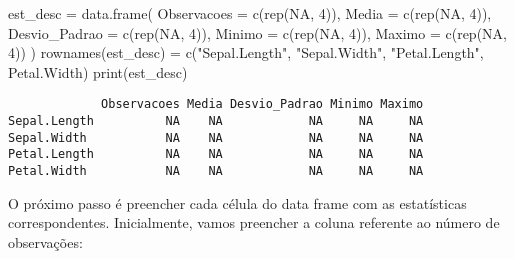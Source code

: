 \documentclass[
  letterpaper,
  DIV=11,
  numbers=noendperiod]{scrreprt}
\newenvironment{Shaded}{\begin{snugshade}}{\end{snugshade}}
\newcommand{\AttributeTok}[1]{\textcolor[rgb]{0.40,0.45,0.13}{#1}}
\newcommand{\ConstantTok}[1]{\textcolor[rgb]{0.56,0.35,0.01}{#1}}
\newcommand{\DecValTok}[1]{\textcolor[rgb]{0.68,0.00,0.00}{#1}}
\newcommand{\FunctionTok}[1]{\textcolor[rgb]{0.28,0.35,0.67}{#1}}
\newcommand{\NormalTok}[1]{\textcolor[rgb]{0.00,0.23,0.31}{#1}}
\newcommand{\OtherTok}[1]{\textcolor[rgb]{0.00,0.23,0.31}{#1}}
\newcommand{\SpecialCharTok}[1]{\textcolor[rgb]{0.37,0.37,0.37}{#1}}
\newcommand{\StringTok}[1]{\textcolor[rgb]{0.13,0.47,0.30}{#1}}
\begin{document}
\begin{Shaded}
\begin{Highlighting}[]
\NormalTok{est\_desc }\OtherTok{=} \FunctionTok{data.frame}\NormalTok{(}
  \AttributeTok{Observacoes =} \FunctionTok{c}\NormalTok{(}\FunctionTok{rep}\NormalTok{(}\ConstantTok{NA}\NormalTok{, }\DecValTok{4}\NormalTok{)),}
  \AttributeTok{Media =} \FunctionTok{c}\NormalTok{(}\FunctionTok{rep}\NormalTok{(}\ConstantTok{NA}\NormalTok{, }\DecValTok{4}\NormalTok{)),}
  \AttributeTok{Desvio\_Padrao =} \FunctionTok{c}\NormalTok{(}\FunctionTok{rep}\NormalTok{(}\ConstantTok{NA}\NormalTok{, }\DecValTok{4}\NormalTok{)),}
  \AttributeTok{Minimo =} \FunctionTok{c}\NormalTok{(}\FunctionTok{rep}\NormalTok{(}\ConstantTok{NA}\NormalTok{, }\DecValTok{4}\NormalTok{)),}
  \AttributeTok{Maximo  =} \FunctionTok{c}\NormalTok{(}\FunctionTok{rep}\NormalTok{(}\ConstantTok{NA}\NormalTok{, }\DecValTok{4}\NormalTok{))}
\NormalTok{)}
\FunctionTok{rownames}\NormalTok{(est\_desc) }\OtherTok{=} \FunctionTok{c}\NormalTok{(}\StringTok{"Sepal.Length"}\NormalTok{, }\StringTok{"Sepal.Width"}\NormalTok{, }\StringTok{"Petal.Length"}\NormalTok{, }\StringTok{\textquotesingle{}Petal.Width\textquotesingle{}}\NormalTok{)}
\FunctionTok{print}\NormalTok{(est\_desc)}
\end{Highlighting}
\end{Shaded}

\begin{verbatim}
             Observacoes Media Desvio_Padrao Minimo Maximo
Sepal.Length          NA    NA            NA     NA     NA
Sepal.Width           NA    NA            NA     NA     NA
Petal.Length          NA    NA            NA     NA     NA
Petal.Width           NA    NA            NA     NA     NA
\end{verbatim}

O próximo passo é preencher cada célula do data frame com as
estatísticas correspondentes. Inicialmente, vamos preencher a coluna
referente ao número de observações:

\begin{Shaded}
\end{Shaded}
\end{document}
